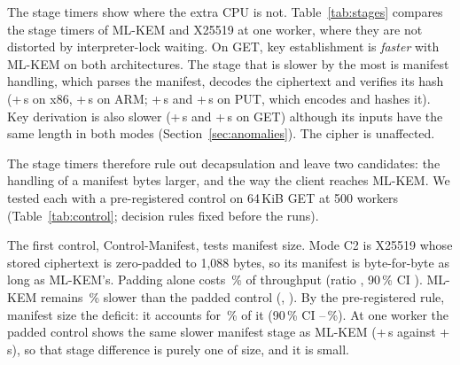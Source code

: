 \documentclass[conference]{IEEEtran}
\newcommand{\lab}[1]{\textsf{#1}}
\begin{document}
\begin{table}[t]
\caption{CPU accounting on 64\,KiB GET: the inverse ratio of client CPU per request (column ``Implied by CPU'', computed from the same runs, so not a prediction in the statistical sense) against the observed throughput ratio to X25519 (\lab{Primary-x86} and \lab{Primary-ARM})}
\label{tab:model}
\centering\footnotesize
\setlength{\tabcolsep}{3pt}
\resizebox{\columnwidth}{!}{}
\end{table}

The stage timers show where the extra CPU is not. Table~\ref{tab:stages} compares the stage timers of ML-KEM
and X25519 at one worker, where they are not distorted by interpreter-lock waiting. On GET, key
establishment is \emph{faster} with ML-KEM on both architectures. The stage that is slower by
the most is manifest handling, which parses the manifest, decodes the ciphertext and verifies
its hash (+\RevGetStageManifestDelta\,\textmu s on x86, +\ArmGetStageManifestDelta\,\textmu s on
ARM; +\RevPutStageManifestDelta\,\textmu s and +\ArmPutStageManifestDelta\,\textmu s on PUT,
which encodes and hashes it). Key derivation is also slower
(+\RevGetStageKdfDelta\,\textmu s and +\ArmGetStageKdfDelta\,\textmu s on GET) although its
inputs have the same length in both modes (Section~\ref{sec:anomalies}). The cipher is
unaffected.

\begin{table}[t]
\caption{ML-KEM-768 minus X25519 at one worker, 64\,KiB objects (\lab{Hybrid-Matrix} and \lab{OneWorker-ARM}, five runs): difference in mean stage time, and in client CPU per request with its 95\,\% interval}
\label{tab:stages}
\centering\footnotesize
\setlength{\tabcolsep}{4pt}

\end{table}

The stage timers therefore rule out decapsulation and leave two candidates: the handling of a
manifest \RevMetaExtraMLKEM{} bytes larger, and the way the client reaches ML-KEM. We tested
each with a pre-registered control on 64\,KiB GET at 500 workers
(Table~\ref{tab:control}; decision rules fixed before the runs).

The first control, \lab{Control-Manifest}, tests manifest size. Mode C2 is X25519 whose stored ciphertext is
zero-padded to 1{,}088 bytes, so its manifest is byte-for-byte as long as ML-KEM's. Padding
alone costs \AudPadCost\,\% of throughput (ratio \AudPadRatio, 90\,\% CI \AudPadCI). ML-KEM
remains \AudRestCost\,\% slower than the padded control (\AudRestRatio, \AudRestCI). By the
pre-registered rule, manifest size \emph{\AudPadVerdict} the deficit: it accounts for
\AudPadShare\,\% of it (90\,\% CI \AudPadShareLo--\AudPadShareHi\,\%). At one worker the padded
control shows the same slower manifest stage as ML-KEM (+\AudPadStageGet\,\textmu s against
+\AudMlkemStageGet\,\textmu s), so that stage difference is purely one of size, and it is
small.
\end{document}
